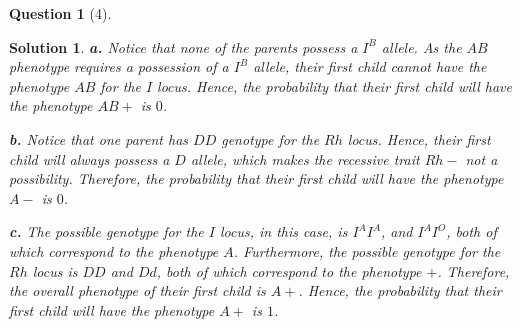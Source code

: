 \documentclass{article} %
\theoremstyle{quest}
\newtheorem*{question}{Question}
\newtheorem*{solution}{Solution}
\begin{document}
\begin{question}[4]
\end{question}
\begin{solution}
\textbf{a.} 
Notice that none of the parents possess a $I^B$ allele. As the $AB$ phenotype requires 
a possession of a $I^B$ allele, their first child cannot have the phenotype $AB$ for the
$I$ locus. Hence, the probability that their first child will have the phenotype $AB+$ is
$0$. \\

\smallskip

\textbf{b.} Notice that one parent has $DD$ genotype for the $Rh$ locus. Hence, their first
child will always possess a $D$ allele, which makes the recessive trait $Rh-$ not a
possibility. Therefore, the probability that their first child will have the phenotype $A-$
is $0$. \\

\smallskip

\textbf{c.} The possible genotype for the $I$ locus, in this case, is
$I^A I^A$, and $I^A I^O$, both of which correspond to the phenotype $A$.
Furthermore, the possible genotype for the $Rh$ locus is $DD$ and $Dd$, both of which correspond 
to the phenotype $+$. Therefore, the overall phenotype of their first child is $A+$.
Hence, the probability that their first child will have the phenotype $A+$ is $1$. \\


\end{solution}
\end{document}
